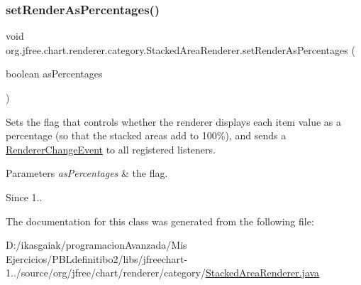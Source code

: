 \subsubsection{\texorpdfstring{set\+Render\+As\+Percentages()}{setRenderAsPercentages()}}
{\footnotesize\ttfamily void org.\+jfree.\+chart.\+renderer.\+category.\+Stacked\+Area\+Renderer.\+set\+Render\+As\+Percentages (\begin{DoxyParamCaption}\item[{boolean}]{as\+Percentages }\end{DoxyParamCaption})}

Sets the flag that controls whether the renderer displays each item value as a percentage (so that the stacked areas add to 100\%), and sends a \mbox{\hyperlink{}{Renderer\+Change\+Event}} to all registered listeners.


\begin{DoxyParams}{Parameters}
{\em as\+Percentages} & the flag.\\
\hline
\end{DoxyParams}
\begin{DoxySince}{Since}
1.. 
\end{DoxySince}


The documentation for this class was generated from the following file\+:\begin{DoxyCompactItemize}
\item 
D\+:/ikasgaiak/programacion\+Avanzada/\+Mis Ejercicios/\+P\+B\+Ldefinitibo2/libs/jfreechart-\/1../source/org/jfree/chart/renderer/category/\mbox{\hyperlink{_stacked_area_renderer_8java}{Stacked\+Area\+Renderer.\+java}}\end{DoxyCompactItemize}
